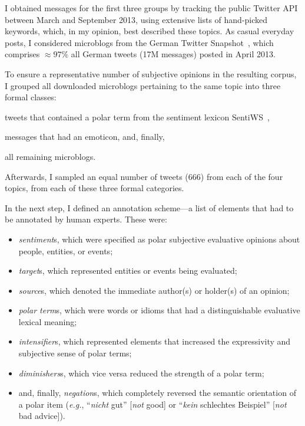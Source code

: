 \documentclass[11pt]{article}
\newcommand{\eg}{\textit{e.g.},}
\renewcommand{\cite}{\citep}
\begin{document}
I obtained messages for the first three groups by tracking the public
Twitter API between March and September 2013, using extensive lists of
hand-picked keywords, which, in my opinion, best described these
topics.  As casual everyday posts, I considered microblogs from the
German Twitter Snapshot~\cite{Scheffler:14}, which comprises
$\approx97\%$ all German tweets (17M messages) posted in April 2013.

To ensure a representative number of subjective opinions in the
resulting corpus, I grouped all downloaded microblogs pertaining to
the same topic into three formal classes:
\begin{inparaenum}[(i)]
  \item tweets that contained a polar term from the sentiment lexicon
    SentiWS~\cite{Remus:10},
  \item messages that had an emoticon, and, finally,
  \item all remaining microblogs.
\end{inparaenum}
Afterwards, I sampled an equal number of tweets (666) from each of the
four topics, from each of these three formal categories.

In the next step, I defined an annotation scheme---a list of elements
that had to be annotated by human experts.  These were:
\begin{itemize}
  \item\emph{sentiment}s, which were specified as polar subjective
    evaluative opinions about people, entities, or events;

  \item\emph{target}s, which represented entities or events being
    evaluated;

  \item\emph{source}s, which denoted the immediate author(s) or
    holder(s) of an opinion;

  \item\emph{polar term}s, which were words or idioms that had a
    distinguishable evaluative lexical meaning;

  \item\emph{intensifier}s, which represented elements that increased
    the expressivity and subjective sense of polar terms;

  \item\emph{diminishers}s, which vice versa reduced the strength of a
    polar term;

  \item and, finally, \emph{negation}s, which completely reversed the
    semantic orientation of a polar item (\eg{} ``\emph{nicht} gut''
    [\emph{not} good] or ``\emph{kein} schlechtes Beispiel''
    [\emph{not} bad advice]).
\end{itemize}
\end{document}
